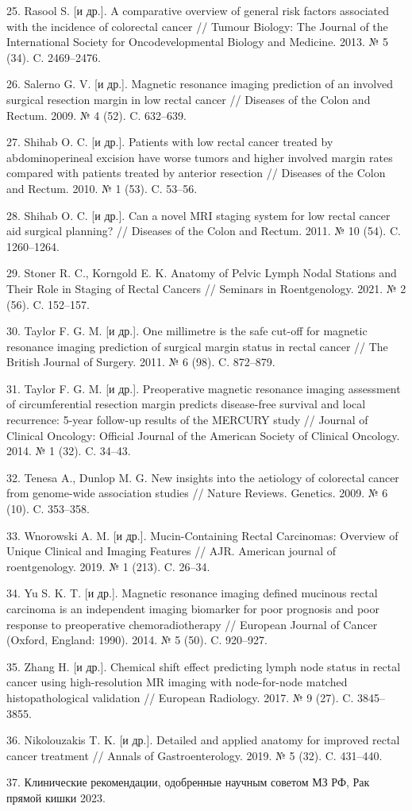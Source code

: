 \documentclass[
  russian,
  12pt,
  a4paper,
]{report}
\begin{document}
25. Rasool S. {[}и др.{]}. A comparative overview of general risk
factors associated with the incidence of colorectal cancer // Tumour
Biology: The Journal of the International Society for Oncodevelopmental
Biology and Medicine. 2013. № 5 (34). C. 2469--2476.

26. Salerno G. V. {[}и др.{]}. Magnetic resonance imaging prediction of
an involved surgical resection margin in low rectal cancer // Diseases
of the Colon and Rectum. 2009. № 4 (52). C. 632--639.

27. Shihab O. C. {[}и др.{]}. Patients with low rectal cancer treated by
abdominoperineal excision have worse tumors and higher involved margin
rates compared with patients treated by anterior resection // Diseases
of the Colon and Rectum. 2010. № 1 (53). C. 53--56.

28. Shihab O. C. {[}и др.{]}. Can a novel MRI staging system for low
rectal cancer aid surgical planning? // Diseases of the Colon and
Rectum. 2011. № 10 (54). C. 1260--1264.

29. Stoner R. C., Korngold E. K. Anatomy of Pelvic Lymph Nodal Stations
and Their Role in Staging of Rectal Cancers // Seminars in
Roentgenology. 2021. № 2 (56). C. 152--157.

30. Taylor F. G. M. {[}и др.{]}. One millimetre is the safe cut-off for
magnetic resonance imaging prediction of surgical margin status in
rectal cancer // The British Journal of Surgery. 2011. № 6 (98). C.
872--879.

31. Taylor F. G. M. {[}и др.{]}. Preoperative magnetic resonance imaging
assessment of circumferential resection margin predicts disease-free
survival and local recurrence: 5-year follow-up results of the MERCURY
study // Journal of Clinical Oncology: Official Journal of the American
Society of Clinical Oncology. 2014. № 1 (32). C. 34--43.

32. Tenesa A., Dunlop M. G. New insights into the aetiology of
colorectal cancer from genome-wide association studies // Nature
Reviews. Genetics. 2009. № 6 (10). C. 353--358.

33. Wnorowski A. M. {[}и др.{]}. Mucin-Containing Rectal Carcinomas:
Overview of Unique Clinical and Imaging Features // AJR. American
journal of roentgenology. 2019. № 1 (213). C. 26--34.

34. Yu S. K. T. {[}и др.{]}. Magnetic resonance imaging defined mucinous
rectal carcinoma is an independent imaging biomarker for poor prognosis
and poor response to preoperative chemoradiotherapy // European Journal
of Cancer (Oxford, England: 1990). 2014. № 5 (50). C. 920--927.

35. Zhang H. {[}и др.{]}. Chemical shift effect predicting lymph node
status in rectal cancer using high-resolution MR imaging with
node-for-node matched histopathological validation // European
Radiology. 2017. № 9 (27). C. 3845--3855.

36. Νikolouzakis Τ. Κ. {[}и др.{]}. Detailed and applied anatomy for
improved rectal cancer treatment // Annals of Gastroenterology. 2019. №
5 (32). C. 431--440.

37. Клинические рекомендации, одобренные научным советом МЗ РФ, Рак
прямой кишки 2023.
\end{document}
